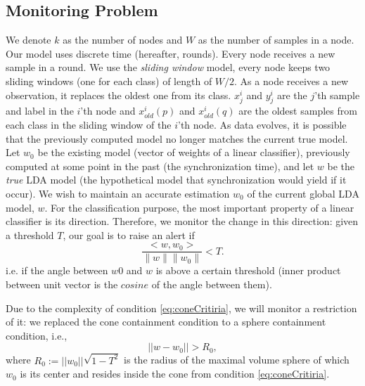\subsection{Monitoring Problem}
We denote $k$ as the number of nodes and $W$ as the number of samples in a node.
Our model uses discrete time (hereafter, rounds). Every node receives a new sample
in a round. We use the \textit{sliding window} model, every node keeps two sliding windows (one for each class) of length of $W/2$. As a node receives a new observation, it replaces the oldest one from its class.
$x^i_j$ and $y^i_j$ are the $j$'th sample and label in the $i$'th node
and $x_{old}^i(p)$ and $x_{old}^i(q)$ are the oldest samples from each class in
the sliding window of the $i$'th node.
As data evolves, it is possible that the previously computed model
no longer matches the current true model. Let $w_0$ be the existing model (vector of weights of a linear classifier), previously computed at some point in the past (the synchronization time), and let $w$ be the \textit{true} LDA model (the hypothetical model that synchronization would yield if it occur).
We wish to maintain an accurate estimation $w_0$ of the current global LDA model, $w$.
For the classification purpose, the most important property of a linear classifier is its direction. Therefore, we monitor the change in this direction: given a threshold $T$, our goal is to raise an alert if
\begin{equation} \label{eq:coneCritiria}
\frac{<w,w_0>}{\parallel w \parallel \parallel w_0 \parallel}  < T.
\end{equation}
i.e. if the angle between $w0$ and $w$ is above a certain threshold (inner product between unit vector is the $cosine$ of the angle between them).

Due to the complexity of condition \ref{eq:coneCritiria}, we will monitor a restriction of it: we replaced the cone containment condition to a  sphere containment condition, i.e., 
\begin{equation} \label{eq:critiria}
||w-w_0||   >  R_0,
\end{equation}
where $R_0 := ||w_0|| \sqrt{1-T^2}$ is the radius of the maximal volume sphere of which $w_0$ is its center and resides inside the cone from condition \ref{eq:coneCritiria}.


